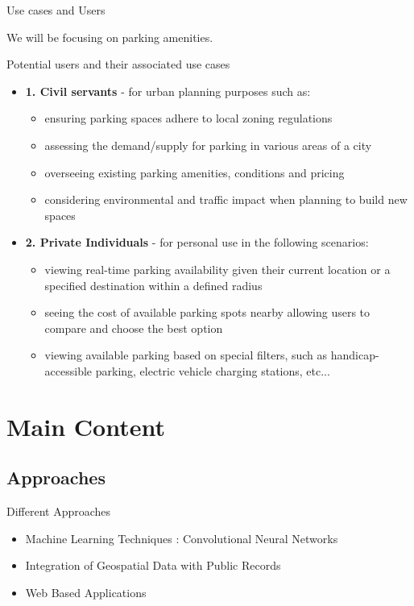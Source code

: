 \documentclass{beamer}
\begin{document}
\begin{frame}{Use cases and Users}
    \item We will be focusing on parking amenities.
    \item{Potential users and their associated use cases}
    \begin{itemize}
        \item{\textbf{1. Civil servants}} - for urban planning purposes such as:
        \begin{itemize}
            \item ensuring parking spaces adhere to local zoning regulations
            \item assessing the demand/supply for parking in various areas of a city
            \item overseeing existing parking amenities, conditions and pricing
            \item considering environmental and traffic impact when planning to build new spaces
        \end{itemize} 
        \item{\textbf{2. Private Individuals}} - for personal use in the following scenarios:
        \begin{itemize}
            \item viewing real-time parking availability given their current location or a specified destination within a defined radius
            \item  seeing the cost of available parking spots  nearby allowing users to compare and choose the best option
            \item viewing available parking based on special filters, such as handicap-accessible parking, electric vehicle charging stations, etc...
        \end{itemize} 
    \end{itemize}
\end{frame}

\section{Main Content}
\subsection{Approaches}
\begin{frame}{Different Approaches}
    \begin{itemize}
        \item{Machine Learning Techniques : Convolutional Neural Networks}
        \item{Integration of Geospatial Data with Public Records}
        \item{Web Based Applications}
    \end{itemize}
\end{frame}
\end{document}
